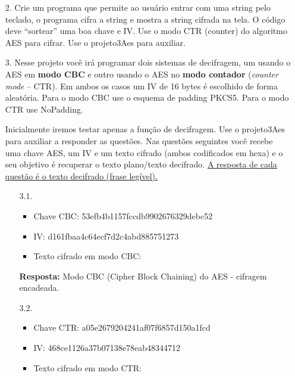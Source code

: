 \documentclass[12pt,a4paper]{article}
\begin{document}
\begin{enumerate}
			\item[2.] Crie um programa que permite ao usuário entrar com uma string pelo teclado, o programa cifra a string e mostra a string cifrada na tela. O código deve ``sortear'' uma boa chave e IV. Use o modo CTR (counter) do algoritmo AES para cifrar. Use o projeto3Aes para auxiliar.
			
			\item[3.] Nesse projeto você irá programar dois sistemas de decifragem, um usando o AES em \textbf{modo CBC} e outro usando o AES no \textbf{modo contador} (\textit{counter mode} -- CTR). Em ambos os casos um IV de 16 bytes é escolhido de forma aleatória. Para o modo CBC use o esquema de padding PKCS5. Para o modo CTR use NoPadding.
			
				Inicialmente iremos testar apenas a função de decifragem. Use o projeto3Aes para auxiliar a responder as questões. Nas questões seguintes você recebe uma chave AES, um IV e um texto cifrado (ambos
codificados em hexa) e o seu objetivo é recuperar o texto plano/texto decifrado. \uline{A resposta de cada questão é o texto decifrado (frase legível).}
				
				\begin{enumerate}
					\item[3.1.] 
						\begin{itemize}
							\item Chave CBC: 53efb4b1157fccdb9902676329debc52
							\item IV: d161fbaa4c64ecf7d2c4abd885751273
							\item Texto cifrado em modo CBC: 
						\end{itemize}
						
						\textbf{Resposta:} Modo CBC (Cipher Block Chaining) do AES - cifragem encadeada.
						
					\item[3.2.]
						\begin{itemize}
							\item Chave CTR: a05e2679204241af07f6857d150a1fcd
							\item IV: 468ce1126a37b07138e78eab48344712
							\item Texto cifrado em modo CTR: 
						\end{itemize}
						

\end{enumerate}
\end{enumerate}
\end{document}

